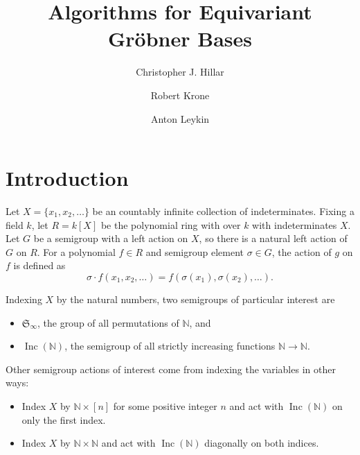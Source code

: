\documentclass{amsart}
\theoremstyle{definition}
\theoremstyle{remark}
\numberwithin{equation}{section}
\newcommand{\B}[1]{\mathbb #1}
\newcommand{\<}{\langle}
\renewcommand{\>}{\rangle}
\newcommand{\Inc}{\operatorname{Inc}(\B N)}
\begin{document}
 \title[Algorithms for Equivariant Gr\"obner Bases]
{Algorithms for Equivariant Gr\"obner Bases}

\author{Christopher J. Hillar}
\address{Redwood Center for Theoretical Neuroscience, University of California, Berkeley}

\author{Robert Krone}
\address{Georgia Institute of Technology, Atlanta, GA}

\author{Anton Leykin}
\address{Georgia Institute of Technology, Atlanta, GA}


%




\maketitle

\section{Introduction}
Let $X = \{x_1,x_2,\ldots\}$ be an countably infinite collection of indeterminates.  Fixing a field $k$, let $R = k[X]$ be the polynomial ring with over $k$ with indeterminates $X$.  Let $G$ be a semigroup with a left action on $X$, so there is a natural left action of $G$ on $R$.  For a polynomial $f \in R$ and semigroup element $\sigma \in G$, the action of $g$ on $f$ is defined as
 \[ \sigma\cdot f(x_1,x_2,\ldots) = f(\sigma(x_1),\sigma(x_2),\ldots). \]

Indexing $X$ by the natural numbers, two semigroups of particular interest are
\begin{itemize}
 \item ${\mathfrak S}_{\infty}$, the group of all permutations of $\B N$, and
 \item $\Inc$, the semigroup of all strictly increasing functions $\B N \to \B N$.
\end{itemize}
Other semigroup actions of interest come from indexing the variables in other ways:
\begin{itemize}
 \item Index $X$ by $\B N \times [n]$ for some positive integer $n$ and act with $\Inc$ on only the first index.
 \item Index $X$ by $\B N \times \B N$ and act with $\Inc$ diagonally on both indices.
\end{itemize}
\end{document}
